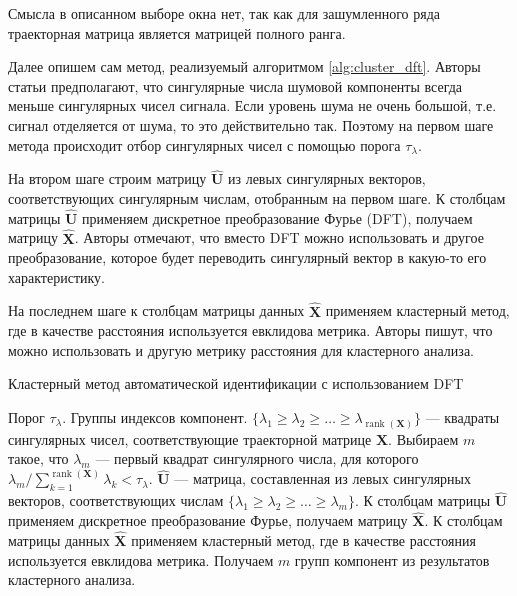 \documentclass[specialist,
               substylefile = spbu.rtx,
               subf,href,colorlinks=true, 12pt]{disser}
\def\rank{\mathop{\mathrm{rank}}}
\begin{document}
Смысла в описанном выборе окна нет, так как для зашумленного ряда траекторная матрица является матрицей полного ранга.

Далее опишем сам метод, реализуемый алгоритмом \ref{alg:cluster_dft}. 
Авторы статьи предполагают, что сингулярные числа шумовой компоненты всегда меньше сингулярных чисел сигнала.
Если уровень шума не очень большой, т.е. сигнал отделяется от шума, то это действительно так. Поэтому на первом шаге метода происходит отбор сингулярных чисел с помощью порога $\tau_\lambda$.

На втором шаге строим матрицу  $\mathbf{\hat U}$ из левых сингулярных векторов, соответствующих сингулярным числам, отобранным на первом шаге. К столбцам матрицы $\mathbf{\hat U}$ применяем дискретное преобразование Фурье (DFT), получаем матрицу $\mathbf{\hat X}$. Авторы отмечают, что вместо DFT можно использовать и другое преобразование, которое будет переводить сингулярный вектор в какую-то его характеристику.

На последнем шаге к столбцам матрицы данных $\mathbf{\hat X}$ применяем кластерный метод, где в качестве расстояния используется евклидова метрика. Авторы пишут, что можно использовать и другую метрику расстояния для кластерного анализа.

 \begin{algorithm}[!hhh]
\caption{Кластерный метод автоматической идентификации с использованием DFT}
\label{alg:cluster_dft}
\begin{algorithmic}[1]
\REQUIRE Порог $\tau_\lambda$.
\ENSURE Группы индексов компонент.
\STATE  $\{ \lambda_1 \geqslant \lambda_2 \geqslant \ldots \geqslant \lambda_{\rank(\mathbf{X})}\}$ --- квадраты сингулярных чисел, соответствующие траекторной матрице $\mathbf{X}$. Выбираем $m$ такое, что $\lambda_m$ --- первый квадрат сингулярного числа, для которого $\lambda_m / \sum_{k=1}^{\rank(\mathbf{X})}\lambda_k < \tau_\lambda$. 
\STATE $\mathbf{\hat U}$ --- матрица, составленная из левых сингулярных векторов, соответствующих числам $\{ \lambda_1 \geqslant \lambda_2 \geqslant \ldots \geqslant \lambda_m\}$. К столбцам матрицы $\mathbf{\hat U}$ применяем дискретное преобразование Фурье, получаем матрицу $\mathbf{\hat X}$.
\STATE К столбцам матрицы данных $\mathbf{\hat X}$ применяем кластерный метод, где в качестве расстояния используется евклидова метрика.
\STATE Получаем $m$ групп компонент из результатов кластерного анализа.
\end{algorithmic}
\end{algorithm}
\end{document}

